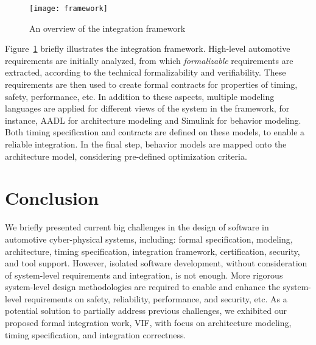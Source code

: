 \begin{figure}[htbp]
	\centering
    \texttt{[image: framework]}
	\caption{An overview of the integration framework}
	\label{fig:framework}
\end{figure}

Figure~\ref{fig:framework} briefly illustrates the integration framework. High-level automotive requirements are initially analyzed, from which \textit{formalizable} requirements are extracted, according to the technical formalizability and verifiability. 
These requirements are then used to create formal contracts for properties of timing, safety, performance, etc. In addition to these aspects, multiple modeling languages are applied for different views of the system in the framework, for instance, AADL for architecture modeling and Simulink for behavior modeling. 
Both timing specification and contracts are defined on these models, to enable a reliable integration. 
In the final step, behavior models are mapped onto the architecture model, considering pre-defined optimization criteria.

\section{Conclusion}
We briefly presented current big challenges in the design of software in automotive cyber-physical systems, including: formal specification, modeling, architecture, timing specification, integration framework, certification, security, and tool support. However, isolated software development, without consideration of system-level requirements and integration, is not enough. More rigorous system-level design methodologies are required to enable and enhance the system-level requirements on safety, reliability, performance, and security, etc. As a potential solution to partially address previous challenges, we  exhibited our proposed formal integration work, VIF, with focus on architecture modeling, timing specification, and integration correctness.

